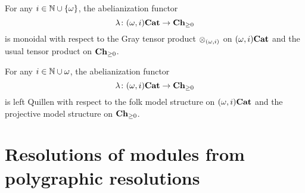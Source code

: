 \documentclass{amsart}
\newcommand{\Ni}{\N\cup\set{\omega}} %
\begin{document}
\begin{proposition}\label{abelmonoidal}
  For any $i \in \Ni$, the abelianization functor
  \[\lambda \colon (\omega,i)\mathbf{Cat} \to \mathbf{Ch}_{\geq 0}\]
  is monoidal with respect to the Gray tensor product
  $\operatorname{\otimes}_{(\omega,i)}$ on $(\omega,i)\mathbf{Cat}$ and the usual tensor product on
  $\mathbf{Ch}_{\geq 0}$.
\end{proposition}
\begin{proposition}
  For any $i \in \mathbb N\cup{\omega}$, the abelianization functor
  \[\lambda \colon (\omega,i)\mathbf{Cat} \to \mathbf{Ch}_{\geq 0}\]
  is left Quillen with respect to the folk model structure on
  $(\omega,i)\mathbf{Cat}$ and the projective model structure on $\mathbf{Ch}_{\geq 0}$.
\end{proposition}
\section{Resolutions of modules from polygraphic resolutions}
\end{document}
